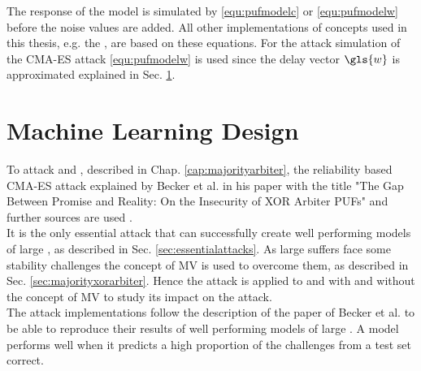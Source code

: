 The response of the \apuf model is simulated by \ref{equ:pufmodelc} or \ref{equ:pufmodelw} before the noise values are added.
All other implementations of \puf concepts used in this thesis, e.g. the \mpuf, are based on these \apuf equations.
For the attack simulation of the \ac{CMA-ES} attack \ref{equ:pufmodelw} is used since the delay vector $\gls{w}$ is approximated explained in Sec. \ref{sec:machinelearningdesign}.


\section{Machine Learning Design}
\label{sec:machinelearningdesign}

To attack \mpufs and \mxpufs, described in Chap. \ref{cap:majorityarbiter}, the reliability based \ac{CMA-ES} attack explained by Becker et al. in his paper with the title "The Gap Between Promise and Reality: On the Insecurity of XOR Arbiter PUFs" and further sources are used \cite{Becker2015ThePUFs,2017CMA-ES,Hansen2011TheTutorial,Hansen2006TheReview}.\\
It is the only essential attack that can successfully create well performing models of large \xpufs, as described in Sec. \ref{sec:essentialattacks}.
As large \xpufs suffers face some stability challenges the concept of \ac{MV} is used to overcome them, as described in Sec. \ref{sec:majorityxorarbiter}.
Hence the attack is applied to \apufs and \xpufs with and without the concept of \ac{MV} to study its impact on the attack.\\
The attack implementations follow the description of the paper of Becker et al. to be able to reproduce their results of well performing models of large \xpufs \cite{Becker2015ThePUFs}.
A model performs well when it predicts a high proportion of the challenges from a test set correct.

